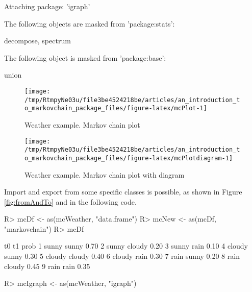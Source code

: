 \documentclass[article,nojss]{jss}
\begin{document}
\begin{CodeChunk}

\begin{CodeOutput}

Attaching package: 'igraph'
\end{CodeOutput}

\begin{CodeOutput}
The following objects are masked from 'package:stats':

    decompose, spectrum
\end{CodeOutput}

\begin{CodeOutput}
The following object is masked from 'package:base':

    union
\end{CodeOutput}
\begin{figure}

{\centering \texttt{[image: /tmp/RtmpyNe03u/file3be4524218be/articles/an\_introduction\_to\_markovchain\_package\_files/figure-latex/mcPlot-1]} 

}

\caption[Weather example]{Weather example. Markov chain plot}\label{fig:mcPlot}
\end{figure}
\end{CodeChunk}

\begin{CodeChunk}
\begin{figure}

{\centering \texttt{[image: /tmp/RtmpyNe03u/file3be4524218be/articles/an\_introduction\_to\_markovchain\_package\_files/figure-latex/mcPlotdiagram-1]} 

}

\caption[Weather example]{Weather example. Markov chain plot with diagram}\label{fig:mcPlotdiagram}
\end{figure}
\end{CodeChunk}

Import and export from some specific classes is possible, as shown in Figure \ref{fig:fromAndTo} and in the following code.

\begin{CodeChunk}

\begin{CodeInput}
R> mcDf <- as(mcWeather, "data.frame")
R> mcNew <- as(mcDf, "markovchain")
R> mcDf
\end{CodeInput}

\begin{CodeOutput}
      t0     t1 prob
1  sunny  sunny 0.70
2  sunny cloudy 0.20
3  sunny   rain 0.10
4 cloudy  sunny 0.30
5 cloudy cloudy 0.40
6 cloudy   rain 0.30
7   rain  sunny 0.20
8   rain cloudy 0.45
9   rain   rain 0.35
\end{CodeOutput}

\begin{CodeInput}
R> mcIgraph <- as(mcWeather, "igraph")
\end{CodeInput}
\end{CodeChunk}
\end{document}
